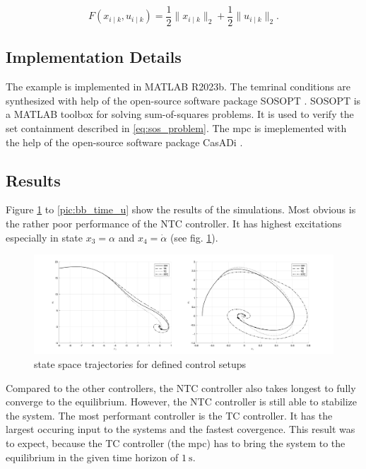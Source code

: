 \documentclass[10pt,a4paper]{article}
\begin{document}
\begin{equation}
	F\left(x_{i \mid k}, u_{i \mid k}\right) = \frac{1}{2} \lVert x_{i \mid k} \rVert_2 + \frac{1}{2} \lVert u_{i \mid k} \rVert_2.
\end{equation}

\subsection{Implementation Details}
The example is implemented in MATLAB R2023b.  The temrinal conditions are synthesized with help of the open-source software package
SOSOPT \cite{seiler2013sosopt}. SOSOPT is a MATLAB toolbox for solving sum-of-squares problems. It is used to verify the set containment
described in \eqref{eq:sos_problem}. The \gls{mpc} is imeplemented with the help of the open-source software package CasADi \cite{Andersson2019}.


\subsection{Results}
Figure \ref{pic:bb_state_space} to \ref{pic:bb_time_u} show the results of the simulations. Most obvious is the rather poor performance of the NTC controller.
It has highest excitations especially in state $x_3 = \alpha$ and $x_4 = \dot{\alpha}$ (see fig. \ref{pic:bb_state_space}).

\begin{figure}[h]
	\begin{center}
		\includegraphics[width=\textwidth]{img/bb_states.png}
		\caption{state space trajectories for defined control setups}
		\label{pic:bb_state_space}
	\end{center}
\end{figure}

Compared to the other controllers, the NTC controller also takes longest to fully converge to the equilibrium. However, the NTC controller is still able to
stabilize the system. The most performant controller is the TC controller. It has the largest occuring input to the systems  and the fastest covergence.
This result was to expect, because the TC controller (the \gls{mpc}) has to bring the system to the equilibrium in the given time horizon of $\SI{1}{\second}$. 
\end{document}

